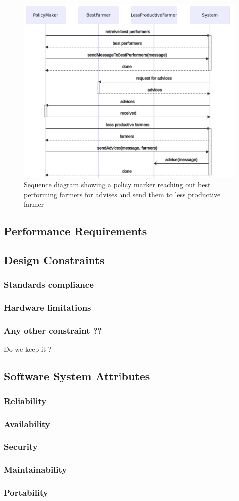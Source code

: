\begin{figure}
	\centering
	\includegraphics[width=\textwidth]{Images/seq-policy-farmers.png}
	\caption{\label{fig:seqpolicymaker} Sequence diagram showing a policy marker reaching out best performing farmers for advises and send them to less productive farmer}
\end{figure}

\subsection{Performance Requirements}

\subsection{Design Constraints}
\subsubsection{Standards compliance}
\subsubsection{Hardware limitations}
\subsubsection{Any other constraint ??}
Do we keep it ?
\subsection{Software System Attributes}
\subsubsection{Reliability}
\subsubsection{Availability}
\subsubsection{Security}
\subsubsection{Maintainability}
\subsubsection{Portability}
